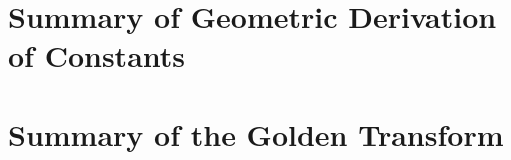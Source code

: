 \documentclass{article}
\theoremstyle{plain}
\theoremstyle{definition}
\begin{document}
\appendix
\section{Summary of Geometric Derivation of Constants}
\section{Summary of the Golden Transform}

\end{document}
